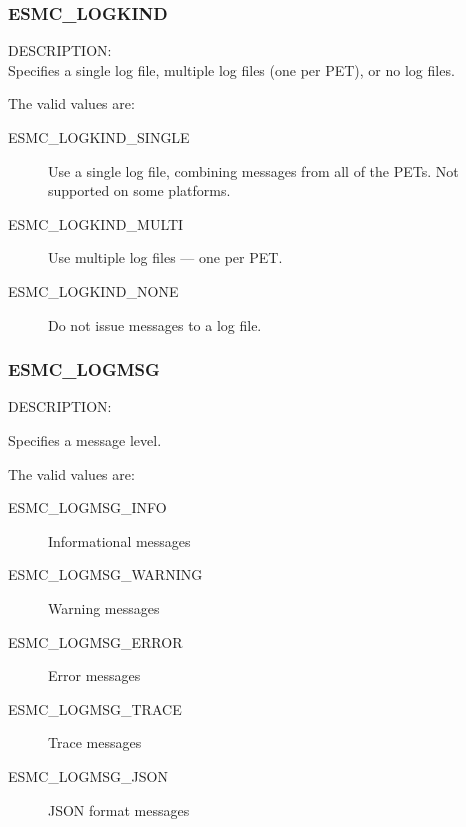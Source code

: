 

\subsubsection{ESMC\_LOGKIND}
\label{const:clogkindflag}

{\sf DESCRIPTION:\\}
Specifies a single log file, multiple log files (one per PET), or no log files.

The valid values are:
\begin{description}
   \item [ESMC\_LOGKIND\_SINGLE] 
         Use a single log file, combining messages from all of the PETs.  Not supported on some platforms.
   \item [ESMC\_LOGKIND\_MULTI]
         Use multiple log files --- one per PET.
   \item [ESMC\_LOGKIND\_NONE]
         Do not issue messages to a log file.
\end{description}


\subsubsection{ESMC\_LOGMSG}
\label{const:clogmsgflag}

{\sf DESCRIPTION:\\}
\begin{sloppypar}
Specifies a message level.
\end{sloppypar}

The valid values are:
\begin{description}
   \item [ESMC\_LOGMSG\_INFO] 
         Informational messages
   \item [ESMC\_LOGMSG\_WARNING]
         Warning messages
   \item [ESMC\_LOGMSG\_ERROR]
         Error messages
   \item [ESMC\_LOGMSG\_TRACE]
         Trace messages
   \item [ESMC\_LOGMSG\_JSON]
         JSON format messages
\end{description}
